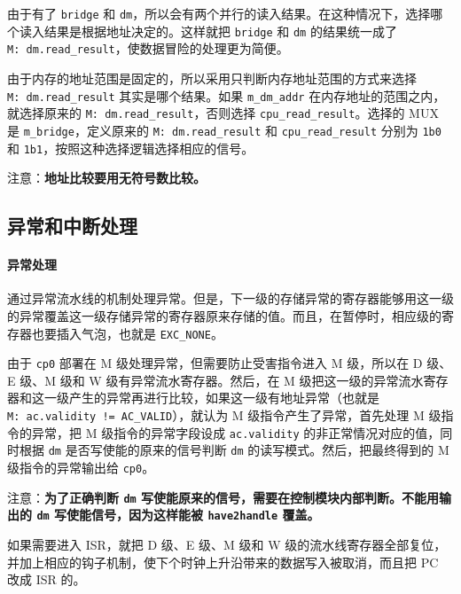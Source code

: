 \documentclass[12pt,AutoFakeBold,AutoFakeSlant]{article}
\begin{document}
由于有了 \texttt{bridge} 和
\texttt{dm}，所以会有两个并行的读入结果。在这种情况下，选择哪个读入结果是根据地址决定的。这样就把
\texttt{bridge} 和 \texttt{dm} 的结果统一成了
\texttt{M:\ dm.read\_result}，使数据冒险的处理更为简便。

由于内存的地址范围是固定的，所以采用只判断内存地址范围的方式来选择
\texttt{M:\ dm.read\_result} 其实是哪个结果。如果 \texttt{m\_dm\_addr}
在内存地址的范围之内，就选择原来的
\texttt{M:\ dm.read\_result}，否则选择
\texttt{cpu\_read\_result}。选择的 MUX 是 \texttt{m\_bridge}，定义原来的
\texttt{M:\ dm.read\_result} 和 \texttt{cpu\_read\_result} 分别为
\texttt{1\textquotesingle{}b0} 和
\texttt{1\textquotesingle{}b1}，按照这种选择逻辑选择相应的信号。

注意：\textbf{地址比较要用无符号数比较。}

\hypertarget{ux5f02ux5e38ux548cux4e2dux65adux5904ux7406}{%
\subsection{异常和中断处理}\label{ux5f02ux5e38ux548cux4e2dux65adux5904ux7406}}

\hypertarget{ux5f02ux5e38ux5904ux7406-1}{%
\paragraph{异常处理}\label{ux5f02ux5e38ux5904ux7406-1}}

通过异常流水线的机制处理异常。但是，下一级的存储异常的寄存器能够用这一级的异常覆盖这一级存储异常的寄存器原来存储的值。而且，在暂停时，相应级的寄存器也要插入气泡，也就是
\texttt{EXC\_NONE}。

由于 \texttt{cp0} 部署在 M 级处理异常，但需要防止受害指令进入 M
级，所以在 D 级、E 级、M 级和 W 级有异常流水寄存器。然后，在 M
级把这一级的异常流水寄存器和这一级产生的异常再进行比较，如果这一级有地址异常（也就是
\texttt{M:\ ac.validity\ !=\ AC\_VALID}），就认为 M
级指令产生了异常，首先处理 M 级指令的异常，把 M 级指令的异常字段设成
\texttt{ac.validity} 的非正常情况对应的值，同时根据 \texttt{dm}
是否写使能的原来的信号判断 \texttt{dm} 的读写模式。然后，把最终得到的 M
级指令的异常输出给 \texttt{cp0}。

注意：\textbf{为了正确判断 \texttt{dm}
写使能原来的信号，需要在控制模块内部判断。不能用输出的 \texttt{dm}
写使能信号，因为这样能被 \texttt{have2handle} 覆盖。}

如果需要进入 ISR，就把 D 级、E 级、M 级和 W
级的流水线寄存器全部复位，并加上相应的钩子机制，使下个时钟上升沿带来的数据写入被取消，而且把
PC 改成 ISR 的。
\end{document}

